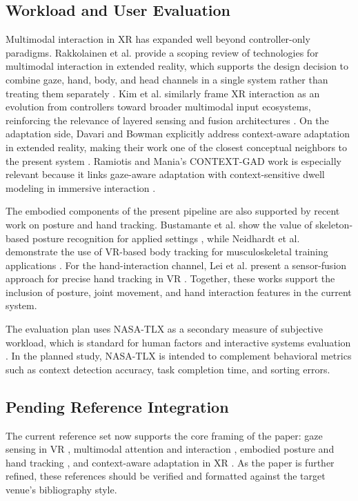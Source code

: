 \documentclass[10pt,twocolumn]{article}
\begin{document}
\subsection{Workload and User Evaluation}
Multimodal interaction in XR has expanded well beyond controller-only paradigms. Rakkolainen et al. provide a scoping review of technologies for multimodal interaction in extended reality, which supports the design decision to combine gaze, hand, body, and head channels in a single system rather than treating them separately \cite{rakkolainen2021}. Kim et al. similarly frame XR interaction as an evolution from controllers toward broader multimodal input ecosystems, reinforcing the relevance of layered sensing and fusion architectures \cite{kim2026}. On the adaptation side, Davari and Bowman explicitly address context-aware adaptation in extended reality, making their work one of the closest conceptual neighbors to the present system \cite{davari2024}. Ramiotis and Mania's CONTEXT-GAD work is especially relevant because it links gaze-aware adaptation with context-sensitive dwell modeling in immersive interaction \cite{ramiotis2025}.

The embodied components of the present pipeline are also supported by recent work on posture and hand tracking. Bustamante et al. show the value of skeleton-based posture recognition for applied settings \cite{bustamante2025}, while Neidhardt et al. demonstrate the use of VR-based body tracking for musculoskeletal training applications \cite{neidhardt2023}. For the hand-interaction channel, Lei et al. present a sensor-fusion approach for precise hand tracking in VR \cite{lei2023}. Together, these works support the inclusion of posture, joint movement, and hand interaction features in the current system.

The evaluation plan uses NASA-TLX as a secondary measure of subjective workload, which is standard for human factors and interactive systems evaluation \cite{hart1988}. In the planned study, NASA-TLX is intended to complement behavioral metrics such as context detection accuracy, task completion time, and sorting errors.

\subsection{Pending Reference Integration}
The current reference set now supports the core framing of the paper: gaze sensing in VR \cite{moreno2024,gazecomparison2020}, multimodal attention and interaction \cite{long2024,rakkolainen2021,kim2026}, embodied posture and hand tracking \cite{bustamante2025,neidhardt2023,lei2023}, and context-aware adaptation in XR \cite{davari2024,ramiotis2025}. As the paper is further refined, these references should be verified and formatted against the target venue's bibliography style.
\end{document}
